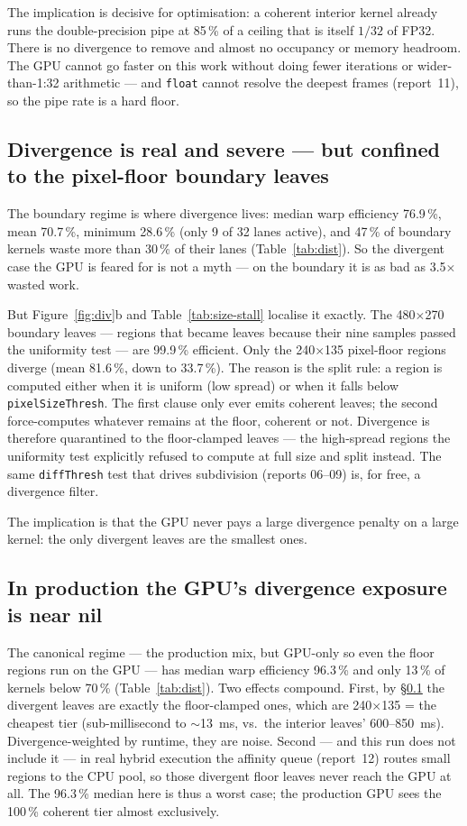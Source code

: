\documentclass[
	english,
	letterpaper, oneside
]{article}
\begin{document}
The implication is decisive for optimisation: a coherent interior kernel already
runs the double-precision pipe at 85\,\% of a ceiling that is itself
$1/32$ of FP32. There is no divergence to remove and almost no occupancy or
memory headroom. The GPU cannot go faster on this work without doing
fewer iterations or wider-than-1:32 arithmetic --- and \texttt{float}
cannot resolve the deepest frames (report~11), so the pipe rate is a hard floor.

\subsection{Divergence is real and severe --- but confined to the pixel-floor
boundary leaves}\label{sec:div}

The boundary regime is where divergence lives: median warp efficiency 76.9\,\%,
mean 70.7\,\%, minimum 28.6\,\% (only 9 of 32 lanes active), and 47\,\% of
boundary kernels waste more than 30\,\% of their lanes (Table~\ref{tab:dist}).
So the divergent case the GPU is feared for is not a myth --- on the boundary it
is as bad as 3.5$\times$ wasted work.

But Figure~\ref{fig:div}b and Table~\ref{tab:size-stall} localise it exactly. The
480$\times$270 boundary leaves --- regions that became leaves because their nine
samples passed the uniformity test --- are 99.9\,\% efficient. Only the
240$\times$135 pixel-floor regions diverge (mean 81.6\,\%, down to
33.7\,\%). The reason is the split rule: a region is computed either when it is
uniform (low spread) or when it falls below \texttt{pixelSizeThresh}. The
first clause only ever emits coherent leaves; the second force-computes
whatever remains at the floor, coherent or not. Divergence is therefore quarantined
to the floor-clamped leaves --- the high-spread regions the uniformity test
explicitly refused to compute at full size and split instead. The same
\texttt{diffThresh} test that drives subdivision (reports 06--09) is, for free, a
divergence filter.

The implication is that the GPU never pays a large divergence penalty on a large
kernel: the only divergent leaves are the smallest ones.

\subsection{In production the GPU's divergence exposure is near nil}

The canonical regime --- the production mix, but GPU-only so even the floor
regions run on the GPU --- has median warp efficiency 96.3\,\% and only 13\,\% of
kernels below 70\,\% (Table~\ref{tab:dist}). Two effects compound. First, by
\S\ref{sec:div} the divergent leaves are exactly the floor-clamped ones, which are
240$\times$135 = the cheapest tier (sub-millisecond to $\sim$13~ms, vs.\ the
interior leaves' 600--850~ms). Divergence-weighted by runtime, they are noise.
Second --- and this run does not include it --- in real hybrid execution
the affinity queue (report~12) routes small regions to the CPU pool, so those
divergent floor leaves never reach the GPU at all. The 96.3\,\% median here is
thus a worst case; the production GPU sees the 100\,\% coherent tier almost
exclusively.
\end{document}
